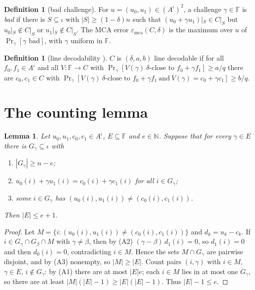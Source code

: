 \documentclass[11pt]{article}
\newtheorem{lemma}[theorem]{Lemma}
\theoremstyle{definition}
\newtheorem{definition}[theorem]{Definition}
\theoremstyle{remark}
\newcommand{\F}{\mathbb{F}}
\newcommand{\mca}{\varepsilon_{\mathrm{mca}}}
\begin{document}
\begin{definition}[bad challenge]
For $u=(u_0,u_1)\in(A^\iota)^2$, a challenge $\gamma\in\F$ is \emph{bad} if there is
$S\subseteq\iota$ with $|S|\ge(1-\delta)n$ such that $(u_0+\gamma u_1)|_S\in C|_S$ but
$u_0|_S\notin C|_S$ or $u_1|_S\notin C|_S$. The MCA error $\mca(C,\delta)$ is the maximum over
$u$ of $\Pr_\gamma[\gamma\text{ bad}]$, with $\gamma$ uniform in $\F$.
\end{definition}

\begin{definition}[line decodability {\cite[Def.~3.1]{GG25}}]
$C$ is $(\delta,a,b)$ line decodable if for all $f_0,f_1\in A^\iota$ and all $V:\F\to C$ with
$\Pr_\gamma[V(\gamma)\ \delta\text{-close to }f_0+\gamma f_1]\ge a/q$ there are $c_0,c_1\in C$ with
$\Pr_\gamma[V(\gamma)\ \delta\text{-close to }f_0+\gamma f_1\ \text{and}\ V(\gamma)=c_0+\gamma
c_1]\ge b/q$.
\end{definition}

\section{The counting lemma}

\begin{lemma}\label{lem:count}
Let $u_0,u_1,c_0,c_1\in A^\iota$, $E\subseteq\F$ and $e\in\mathbb{N}$. Suppose that for every
$\gamma\in E$ there is $G_\gamma\subseteq\iota$ with
\begin{enumerate}
\item[(A1)] $|G_\gamma|\ge n-e$;
\item[(A2)] $u_0(i)+\gamma u_1(i)=c_0(i)+\gamma c_1(i)$ for all $i\in G_\gamma$;
\item[(A3)] some $i\in G_\gamma$ has $(u_0(i),u_1(i))\ne(c_0(i),c_1(i))$.
\end{enumerate}
Then $|E|\le e+1$.
\end{lemma}

\begin{proof}
Let $M=\{i:(u_0(i),u_1(i))\ne(c_0(i),c_1(i))\}$ and $d_k=u_k-c_k$.
If $i\in G_\gamma\cap G_\beta\cap M$ with $\gamma\ne\beta$, then by (A2)
$(\gamma-\beta)\,d_1(i)=0$, so $d_1(i)=0$ and then $d_0(i)=0$, contradicting $i\in M$. Hence the
sets $M\cap G_\gamma$ are pairwise disjoint, and by (A3) nonempty, so $|M|\ge|E|$.
Count pairs $(i,\gamma)$ with $i\in M$, $\gamma\in E$, $i\notin G_\gamma$: by (A1) there are at
most $|E|e$; each $i\in M$ lies in at most one $G_\gamma$, so there are at least
$|M|(|E|-1)\ge|E|(|E|-1)$. Thus $|E|-1\le e$.
\end{proof}
\end{document}
